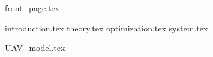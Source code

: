 \documentclass{report}
\numberwithin{equation}{chapter}
\begin{document}
{front_page.tex}

\tableofcontents
\newpage

\pagestyle{fancy}

{introduction.tex}
{theory.tex}
{optimization.tex}
{system.tex}


\begin{appendices}
{UAV_model.tex}
\end{appendices}


\newpage


{}
\end{document}
